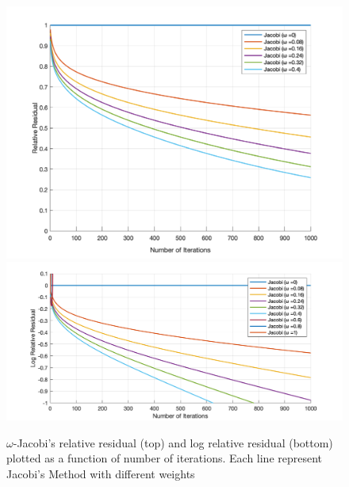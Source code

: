 \documentclass[11pt,titlepage]{article}
\begin{document}
\begin{figure}[!htbp]
\begin{center}
    \includegraphics[width=\textwidth]{archbridge_tiny_jacobi_relres_vs_iters}
    \includegraphics[width=\textwidth]{archbridge_tiny_jacobi_logrelres_vs_iters_full}
    \caption{\label{fig:1} $\omega$-Jacobi's relative residual (top) and log relative residual (bottom) plotted as a function of number of iterations. Each line represent Jacobi's Method with different weights}
\end{center}
\end{figure}
\end{document}
